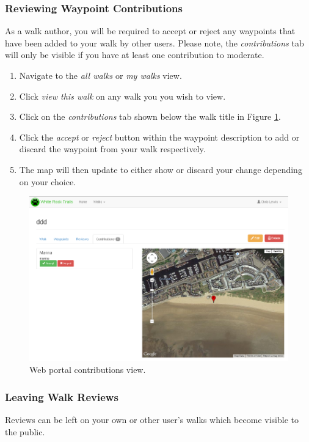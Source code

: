 \documentclass[11pt,a4paper]{report}
\begin{document}
\subsubsection{Reviewing Waypoint Contributions}

As a walk author, you will be required to accept or reject any waypoints that have been added to your walk by other users. Please note, the \emph{contributions} tab will only be visible if you have at least one contribution to moderate.

\begin{enumerate}
\item Navigate to the \emph{all walks} or \emph{my walks} view.
\item Click \emph{view this walk} on any walk you you wish to view.
\item Click on the \emph{contributions} tab shown below the walk title in Figure \ref{fig:waypoint-contributions-guide}.
\item Click the \emph{accept} or \emph{reject} button within the waypoint description to add or discard the waypoint from your walk respectively.
\item The map will then update to either show or discard your change depending on your choice.
\end{enumerate}

\begin{figure}[H]
\centering
\includegraphics[width=0.8\linewidth]{./img/webportal/waypoint-contributions}
\caption{Web portal contributions view.}
\label{fig:waypoint-contributions-guide}
\end{figure}

\subsubsection{Leaving Walk Reviews}

Reviews can be left on your own or other user's walks which become visible to the public.
\end{document}
